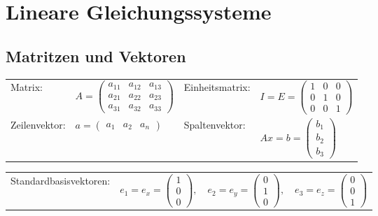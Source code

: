 \section{Lineare Gleichungssysteme}


\subsection{Matritzen und Vektoren}
\begin{tabular}{ll ll}
	
	Matrix: &  
		$A = 
		\begin{pmatrix}
			a_{11}&a_{12}&a_{13}\\
			a_{21}&a_{22}&a_{23}\\
			a_{31}&a_{32}&a_{33}
		\end{pmatrix}$ 
		& 
	Einheitsmatrix: &
	 $I = E = 
		\begin{pmatrix}
			1&0&0\\
			0&1&0\\
			0&0&1
		\end{pmatrix}$ 
	\\
	Zeilenvektor: &
	$a = 
	\begin{pmatrix}
		a_1&a_2&a_n
	\end{pmatrix}$ 
	& 
	Spaltenvektor:&
	$Ax = b = 
	\begin{pmatrix} 
		b_1\\b_2\\b_3 
	\end{pmatrix}$ 
\end{tabular}

\begin{tabular}{l lll}
	Standardbasisvektoren: &
	$ e_1= e_x =
	\begin{pmatrix}	
		1\\0\\0
	\end{pmatrix},$ &
	$ e_2= e_y =
	\begin{pmatrix}
		0\\1\\0
	\end{pmatrix},$ &
	$ e_3= e_z =
	\begin{pmatrix}
		0\\0\\1
	\end{pmatrix}$
\end{tabular}


